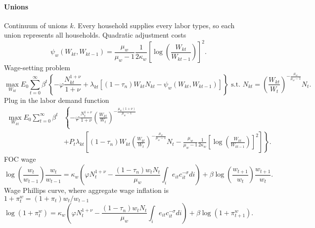 \documentclass[11pt,a4paper]{article}
\begin{document}
\paragraph{Unions}
Continuum of unions $k$. Every household supplies every labor types, so each union represents all households. Quadratic adjustment costs
\begin{equation*}
\psi_w(W_{kt},W_{kt-1})=\frac{\mu_w}{\mu_w-1}\frac{1}{2\kappa_w}\left[\log\left(\frac{W_{kt}}{W_{kt-1}}\right)\right]^2.
\end{equation*}
Wage-setting problem
\begin{equation*}
\max_{W_{kt}}E_0\sum_{t=0}^{\infty}\beta^t\left\{-\varphi\frac{N_{kt}^{1+\nu}}{1+\nu}+\lambda_{kt}\left[(1-\tau_n)W_{kt}N_{kt}-\psi_w(W_{kt},W_{kt-1})\right]\right\}\text{ s.t. }N_{kt}=\left(\frac{W_{kt}}{W_t}\right)^{-\frac{\mu_w}{\mu_w-1}}N_t.
\end{equation*}
Plug in the labor demand function
\begin{equation*}
\begin{split}
\max_{W_{kt}}E_0\sum_{t=0}^{\infty}\beta^t&\left\{-\varphi\frac{N_t^{1+\nu}}{1+\nu}\left(\frac{W_{kt}}{W_t}\right)^{-\frac{\mu_w(1+\nu)}{\mu_w-1}}\right.\\
&+\left.P_t\lambda_{kt}\left[(1-\tau_n) W_{kt}\left(\frac{W_{kt}}{W_t}\right)^{-\frac{\mu_w}{\mu_w-1}}N_t-\frac{\mu_w}{\mu_w-1}\frac{1}{2\kappa_w}\left[\log\left(\frac{W_{kt}}{W_{kt-1}}\right)\right]^2\right]\right\}.
\end{split}
\end{equation*}
FOC wage
\begin{equation*}
\log\left(\frac{w_t}{w_{t-1}}\right)\frac{w_t}{w_{t-1}}=\kappa_w\left(\varphi N_t^{1+\nu}-\frac{(1-\tau_n)w_tN_t}{\mu_w}\int_{i}e_{it}c_{it}^{-\sigma}di\right)+\beta\log\left(\frac{w_{t+1}}{w_{t}}\right)\frac{w_{t+1}}{w_{t}}.
\end{equation*}
Wage Phillips curve, where aggregate wage inflation is $1+\pi_t^w=(1+\pi_t)w_t/w_{t-1}$
\begin{equation*}
\log(1+\pi_t^w)=\kappa_w\left(\varphi N_t^{1+\nu}-\frac{(1-\tau_n)w_tN_t}{\mu_w}\int_{i}e_{it}c_{it}^{-\sigma}di\right)+\beta\log(1+\pi_{t+1}^w).
\end{equation*}
\end{document}
